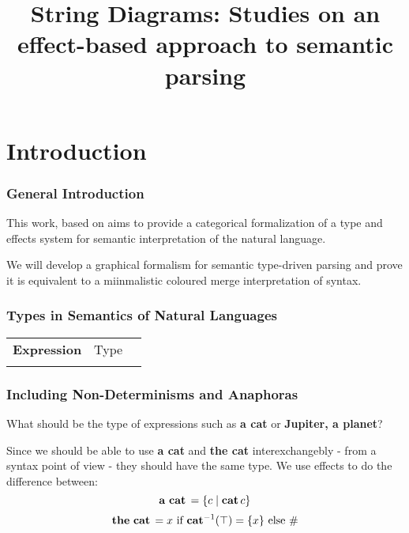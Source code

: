 \documentclass[math, english, info]{beamercours}
\title{String Diagrams: Studies on an effect-based approach to semantic parsing}
\institute{École Normale Supérieure | Yale University}
\begin{document}
\maketitle

\section{Introduction}
\begin{frame}
	\frametitle{General Introduction}
	This work, based on \cite{bumfordEffectdrivenInterpretationFunctors2025} aims
	to provide a categorical formalization of a type and effects system for
	semantic interpretation of the natural language.

	\medskip

	We will develop a graphical formalism for semantic type-driven parsing and prove it is
	equivalent to a miinmalistic coloured merge interpretation of syntax.
\end{frame}

\begin{frame}[fragile]
	\frametitle{Types in Semantics of Natural Languages}
	\setcellgapes{3pt}
	\makegapedcells
	\begin{NiceTabular}{>{\bf}LLL}
		Expression & \rm Type & \lambda{} \\
		\CodeAfter
	\end{NiceTabular}
\end{frame}

\begin{frame}[fragile]
	\frametitle{Including Non-Determinisms and Anaphoras}
	What should be the type of expressions such as \textbf{a cat} or \textbf{Jupiter, a planet}?
	\pause

	\smallskip

	Since we should be able to use \textbf{a cat} and \textbf{the cat} interexchangebly - from a syntax point of view - they should have the same type.
	We use effects to do the difference between:
	\begin{equation*}
		\mathbf{a\ cat}\, = \{c \mid \mathbf{cat}\, c\}
	\end{equation*}
	\begin{equation*}
		\mathbf{the\ cat}\, = x \text{ if } \mathbf{cat}^{-1}(\top) = \{x\} \text{ else } \#
	\end{equation*}
\end{frame}
\end{document}
